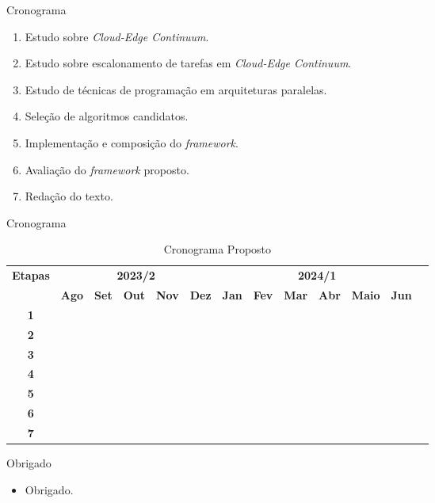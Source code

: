 \begin{frame}{Cronograma}
    \begin{enumerate}
        \item Estudo sobre \textit{Cloud-Edge Continuum}.
        \item Estudo sobre escalonamento de tarefas em \textit{Cloud-Edge Continuum}.
        \item Estudo de técnicas de programação em arquiteturas paralelas.
        \item Seleção de algoritmos candidatos.
        \item Implementação e composição do \textit{framework}.
        \item Avaliação do \textit{framework} proposto.
        \item Redação do texto.
    \end{enumerate}
\end{frame}

\begin{frame}{Cronograma}
    \begin{table}[htpd]
        \tiny
        \centering
        \noindent \begin{tabular}{|c|c|c|c|c|c|c|c|c|c|c|c|c|}
            \hline
            \multirow{2}{*}{\textbf{\small{Etapas}}} & \multicolumn{5}{|c|}{\textbf{\small{2023/2}}} &
            \multicolumn{6}{|c|}{\textbf{\small{2024/1}}} \\
            \cline{2-12}
            &\textbf{Ago} & \textbf{Set} & \textbf{Out} & \textbf{Nov} & \textbf{Dez} & \textbf{Jan} & 
            \textbf{Fev} & \textbf{Mar} & \textbf{Abr} & \textbf{Maio} & \textbf{Jun} \\
            \hline
            \textbf{\small{1}}  & \cellcolor{gray} & \cellcolor{gray} &  &   &   &   &   &   &   &   &   \\
            \hline
            \textbf{\small{2}}  &   & \cellcolor{gray} & \cellcolor{gray} &   &   &   &   &   &   &   &   \\
            \hline
            \textbf{\small{3}}  &   & \cellcolor{gray} & \cellcolor{gray} &   &   &   &   &   &   &   &   \\
            \hline
            \textbf{\small{4}}  &   &   & \cellcolor{gray} & \cellcolor{gray} & \cellcolor{gray} &  &  &  &  &  &   \\
            \hline
            \textbf{\small{5}}  &   &   &   &   & \cellcolor{gray} & \cellcolor{gray} & \cellcolor{gray} & \cellcolor{gray} &  &  &  \\
            \hline
            \textbf{\small{6}}  &   &   &   &   &   &   & \cellcolor{gray} & \cellcolor{gray} & \cellcolor{gray} &   &   \\
            \hline
            \textbf{\small{7}}  & \cellcolor{gray} & \cellcolor{gray} & \cellcolor{gray} & \cellcolor{gray} & \cellcolor{gray} & \cellcolor{gray} & \cellcolor{gray} & \cellcolor{gray} & \cellcolor{gray} & \cellcolor{gray} & \cellcolor{gray} \\
            \hline
        \end{tabular} 
        \label{tab:Cronograma}
        \caption{Cronograma Proposto}
    \end{table}
\end{frame}

\begin{frame}{Obrigado}
    \begin{itemize}
        \item Obrigado.
    \end{itemize}
\end{frame}
